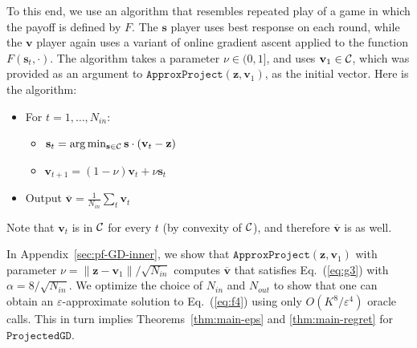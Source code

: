 To this end, we use an algorithm that resembles repeated play of a game in which the payoff is defined by $F$. The $\mathbf{s}$ player uses best response on each round, while the $\mathbf{v}$
player again uses a variant of online gradient ascent applied to the function $F(\mathbf{s}_t,\cdot)$.
The algorithm takes a parameter $\nu\in (0,1]$, and uses
$\mathbf{v}_1\in{\cal C}$, which was provided as an argument to ${\ensuremath{\mathtt{ApproxProject}}}(\mathbf{z},\mathbf{v}_1)$, as the initial vector. Here is the algorithm:

\begin{itemize}  \itemsep0pt \parskip0pt  \item For $t=1,\ldots,{N_{in}}$:

\begin{itemize}  \itemsep0pt \parskip0pt  \item
$\mathbf{s}_t = \arg\min_{\mathbf{s}\in{\cal C}} \mathbf{s}\cdot (\mathbf{v}_t - \mathbf{z})$
\item
$\mathbf{v}_{t+1} = (1-\nu) \mathbf{v}_t + \nu \mathbf{s}_t$
\end{itemize}

\item Output ${\overline{\mathbf{v}}}=\frac{1}{{N_{in}}} \sum_t \mathbf{v}_t$
\end{itemize}

Note that $\mathbf{v}_t$ is in ${\cal C}$ for every $t$ (by convexity of ${\cal C}$), and therefore ${\overline{\mathbf{v}}}$ is as well.

In Appendix~\ref{sec:pf-GD-inner}, we show that ${\ensuremath{\mathtt{ApproxProject}}}(\mathbf{z},\mathbf{v}_1)$ with parameter $ \nu = {\|{\mathbf{z}-\mathbf{v}_1}\|}/{\sqrt{{N_{in}}}}$
computes ${\overline{\mathbf{v}}}$ that satisfies Eq.~(\ref{eq:g3}) with
    ${\alpha} = 8/\sqrt{{N_{in}}}$.
We optimize the choice of ${N_{in}}$ and ${N_{out}}$ to show that one can obtain an $\varepsilon$-approximate solution to Eq.~(\ref{eq:f4}) using only $O(K^8 / \varepsilon^4)$
oracle calls. This in turn implies Theorems~\ref{thm:main-eps} and \ref{thm:main-regret} for \ensuremath{\mathtt{ProjectedGD}}.



